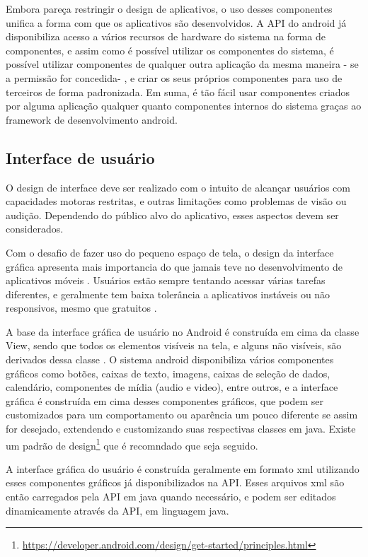 Embora pareça restringir o design de aplicativos, o uso desses componentes unifica a forma com que os aplicativos são desenvolvidos. A API do android já disponibiliza acesso a vários recursos de hardware do sistema na forma de componentes, e assim como é possível utilizar os componentes do sistema, é possível utilizar componentes de qualquer outra aplicação da mesma maneira - se a permissão for concedida- , e criar os seus próprios componentes para uso de terceiros de forma padronizada. Em suma, é tão fácil usar componentes criados por alguma aplicação qualquer quanto componentes internos do sistema graças ao framework de desenvolvimento android.

\subsection{Interface de usuário}

O design de interface deve ser realizado com o intuito de alcançar usuários com capacidades motoras restritas, e outras limitações como problemas de visão ou audição. Dependendo do público alvo do aplicativo, esses aspectos devem ser considerados.

Com o desafio de fazer uso do pequeno espaço de tela, o design da interface gráfica apresenta mais importancia do que jamais teve no desenvolvimento de aplicativos móveis \cite{eswissues}. Usuários estão sempre tentando acessar várias tarefas diferentes, e geralmente tem baixa tolerância a aplicativos instáveis ou não responsivos, mesmo que gratuitos \cite{eswmobile}. 

A base da interface gráfica de usuário no Android é construída em cima da classe View, sendo que todos os elementos visíveis na tela, e alguns não visíveis, são derivados dessa classe \cite{androidarch2010}. O sistema android disponibiliza vários componentes gráficos como botões, caixas de texto, imagens, caixas de seleção de dados, calendário, componentes de mídia (audio e video), entre outros, e a interface gráfica é construída em cima desses componentes gráficos, que podem ser customizados para um comportamento ou aparência um pouco diferente se assim for desejado, extendendo e customizando suas respectivas classes em java. Existe um padrão de design\footnote{\url{https://developer.android.com/design/get-started/principles.html}} que é recomndado que seja seguido.

A interface gráfica do usuário é construída geralmente em formato xml utilizando esses componentes gráficos já disponibilizados na API. Esses arquivos xml são então carregados pela API em java quando necessário, e podem ser editados dinamicamente através da API, em linguagem java.

